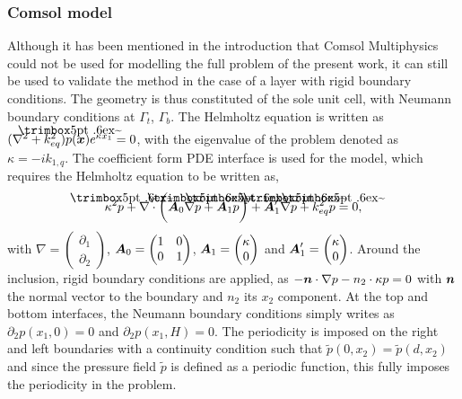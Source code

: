 \subsubsection{Comsol model}
Although it has been mentioned in the introduction that Comsol Multiphysics could not be used for modelling the full problem of the present work, it can still be used to validate the method in the case of a layer with rigid boundary conditions. The geometry is thus constituted of the sole unit cell, with Neumann boundary conditions at $\Gamma_t$, $\Gamma_b$. The Helmholtz equation is written as $(\nabla^2 + k^2_{eq})\tilde p(\mbf x) e^{\kappa x_1} = 0$, with the eigenvalue of the problem denoted as $\kappa = -ik_{1,q}$. The coefficient form PDE interface is used for the model, which requires the Helmholtz equation to be written as,
\begin{equation}
    \kappa^2 \tilde p + \nabla \cdot \left(\mbf A_0 \nabla \tilde p + \mbf A_1 \tilde p\right) + \mbf A_1' \nabla \tilde p + k^2_{eq} \tilde p = 0, 
\end{equation}
with $\nabla = \begin{pmatrix}
    \partial_{1} \\ \partial_{2}
\end{pmatrix}$, $\boldsymbol A_0 = \begin{pmatrix}
    1 & 0 \\ 0 & 1
\end{pmatrix}$, $\boldsymbol A_1 = \begin{pmatrix} \kappa \\ 0 \end{pmatrix}$ and $\boldsymbol A_1' = \begin{pmatrix} \kappa \\ 0 \end{pmatrix}$. Around the inclusion, rigid boundary conditions are applied, as $-\boldsymbol n \cdot \nabla p - n_2 \cdot \kappa p = 0$ with $\boldsymbol n$ the normal vector to the boundary and $n_2$ its $x_2$ component. At the top and bottom interfaces, the Neumann boundary conditions simply writes as $\partial_2 p(x_1, 0) = 0$ and $\partial_2 p(x_1, H) = 0$. The periodicity is imposed on the right and left boundaries with a continuity condition such that $\tilde p(0, x_2) = \tilde p(d, x_2)$ and since the pressure field $\tilde p$ is defined as a periodic function, this fully imposes the periodicity in the problem. 

